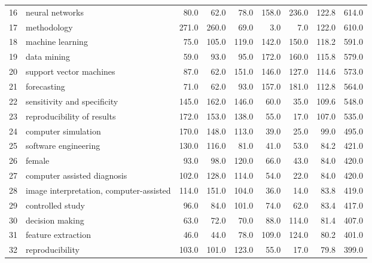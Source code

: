 \begin{tabular}{llrrrrrrr}
16 &                          neural networks &    80.0 &    62.0 &    78.0 &   158.0 &   236.0 &   122.8 &   614.0 \\
17 &                              methodology &   271.0 &   260.0 &    69.0 &     3.0 &     7.0 &   122.0 &   610.0 \\
18 &                         machine learning &    75.0 &   105.0 &   119.0 &   142.0 &   150.0 &   118.2 &   591.0 \\
19 &                              data mining &    59.0 &    93.0 &    95.0 &   172.0 &   160.0 &   115.8 &   579.0 \\
20 &                  support vector machines &    87.0 &    62.0 &   151.0 &   146.0 &   127.0 &   114.6 &   573.0 \\
21 &                              forecasting &    71.0 &    62.0 &    93.0 &   157.0 &   181.0 &   112.8 &   564.0 \\
22 &              sensitivity and specificity &   145.0 &   162.0 &   146.0 &    60.0 &    35.0 &   109.6 &   548.0 \\
23 &               reproducibility of results &   172.0 &   153.0 &   138.0 &    55.0 &    17.0 &   107.0 &   535.0 \\
24 &                      computer simulation &   170.0 &   148.0 &   113.0 &    39.0 &    25.0 &    99.0 &   495.0 \\
25 &                     software engineering &   130.0 &   116.0 &    81.0 &    41.0 &    53.0 &    84.2 &   421.0 \\
26 &                                   female &    93.0 &    98.0 &   120.0 &    66.0 &    43.0 &    84.0 &   420.0 \\
27 &              computer assisted diagnosis &   102.0 &   128.0 &   114.0 &    54.0 &    22.0 &    84.0 &   420.0 \\
28 &  image interpretation, computer-assisted &   114.0 &   151.0 &   104.0 &    36.0 &    14.0 &    83.8 &   419.0 \\
29 &                         controlled study &    96.0 &    84.0 &   101.0 &    74.0 &    62.0 &    83.4 &   417.0 \\
30 &                          decision making &    63.0 &    72.0 &    70.0 &    88.0 &   114.0 &    81.4 &   407.0 \\
31 &                       feature extraction &    46.0 &    44.0 &    78.0 &   109.0 &   124.0 &    80.2 &   401.0 \\
32 &                          reproducibility &   103.0 &   101.0 &   123.0 &    55.0 &    17.0 &    79.8 &   399.0 \\

\end{tabular}
